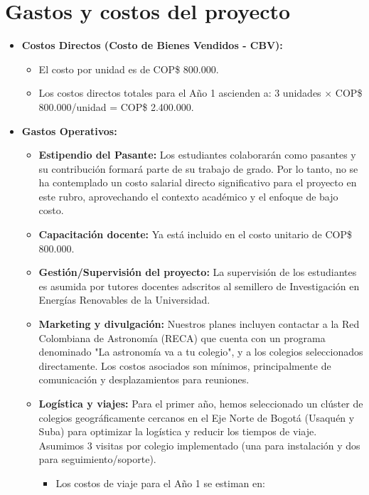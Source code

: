 \section{Gastos y costos del proyecto}

\begin{itemize}
  \item \textbf{Costos Directos (Costo de Bienes Vendidos - CBV):}
    \begin{itemize}
      \item El costo por unidad es de COP\$ 800.000.
      \item Los costos directos totales para el Año 1 ascienden a:
        3 unidades $\times$ COP\$ 800.000/unidad = COP\$ 2.400.000.
    \end{itemize}
  \item \textbf{Gastos Operativos:}
    \begin{itemize}
      \item \textbf{Estipendio del Pasante:} Los estudiantes colaborarán como
        pasantes y su contribución formará parte de su trabajo de grado. Por
        lo tanto, no se ha contemplado un costo salarial directo
        significativo para el proyecto en este rubro, aprovechando el
        contexto académico y el enfoque de bajo costo.
      \item \textbf{Capacitación docente:} Ya está incluido en el costo
        unitario de COP\$ 800.000.
      \item \textbf{Gestión/Supervisión del proyecto:} La supervisión de los
        estudiantes es asumida por tutores docentes adscritos al semillero de
        Investigación en Energías Renovables de la Universidad.
      \item \textbf{Marketing y divulgación:} Nuestros planes incluyen
        contactar a la Red Colombiana de Astronomía (RECA) que cuenta con un
        programa denominado "La astronomía va a tu colegio", y a los colegios
        seleccionados directamente. Los costos asociados son mínimos,
        principalmente de comunicación y desplazamientos para reuniones.
      \item \textbf{Logística y viajes:} Para el primer año, hemos
        seleccionado un clúster de colegios geográficamente cercanos en el
        Eje Norte de Bogotá (Usaquén y Suba) para optimizar la logística y
        reducir los tiempos de viaje. Asumimos 3 visitas por colegio
        implementado (una para instalación y dos para seguimiento/soporte).
        \begin{itemize}
          \item Los costos de viaje para el Año 1 se estiman en:

\end{itemize}
\end{itemize}
\end{itemize}
